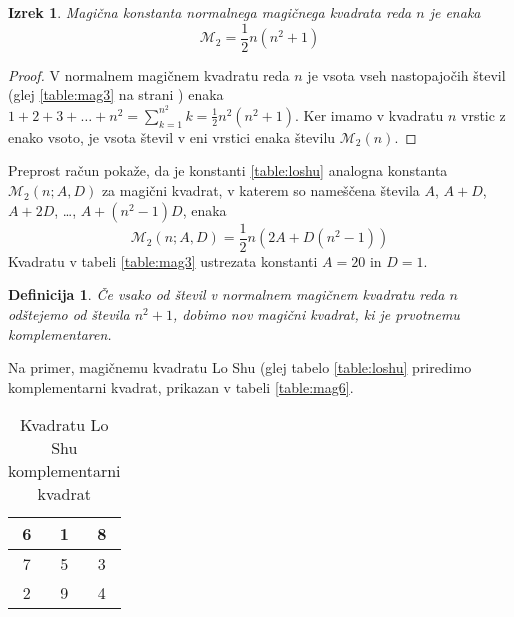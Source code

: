 \documentclass[a4paper,12pt]{article}
\newtheorem{definition}{Definicija}
\newtheorem{theorem}{Izrek}[section]
\newcommand{\m}{\mathcal{M}}
\newcommand{\pojem}[1]{\emph{#1}}
\begin{document}
\begin{theorem}
   Magična konstanta normalnega magičnega kvadrata reda $n$
   je enaka
   \begin{equation}
      \m_2 = \frac{1}{2} n(n^2+1)
   \end{equation}
\end{theorem}

\begin{proof}
   V normalnem magičnem kvadratu reda $n$ je vsota vseh nastopajočih
   števil (glej \ref{table:mag3} na strani \pageref{table:mag3}) enaka
   $1+2+3+\dots+n^2=\sum_{k=1}^{n^2}k=\frac{1}{2}n^2(n^2+1)$. Ker imamo
   v kvadratu $n$ vrstic z enako vsoto, je vsota števil v eni vrstici
   enaka številu $\m_2(n)$. %
   
\end{proof}

Preprost račun pokaže, da je konstanti \ref{table:loshu} analogna konstanta
$\m_2(n;A,D)$ za magični kvadrat, v katerem so nameščena števila
$A$, $A+D$, $A+2D$, \dots, $A+(n^2-1)D$, enaka %
\begin{equation}
   \m_2(n;A,D) = \frac{1}{2}n (2A + D(n^2-1))
\end{equation}
Kvadratu v tabeli \ref{table:mag3} ustrezata konstanti $A=20$ in $D=1$.

\begin{definition}

      Če vsako od števil v normalnem magičnem kvadratu reda $n$ odštejemo
      od števila $n^2+1$, dobimo nov magični kvadrat, ki je prvotnemu
      \pojem{komplementaren}.
\end{definition}

Na primer, magičnemu kvadratu Lo Shu (glej tabelo \ref{table:loshu} priredimo
komplementarni kvadrat, prikazan v tabeli \ref{table:mag6}.

\begin{table}[!ht]
   \centering
   \caption{Kvadratu Lo Shu komplementarni kvadrat}
   \label{table:closhu}
   \begin{tabular}{|*{3}{c|}}
      \hline
      6 & 1 & 8 \\
      \hline
      7 & 5 & 3 \\
      \hline
      2 & 9 & 4 \\
      \hline
    
      \hline

      
   \end{tabular}
   
\end{table}
%
\end{document}

